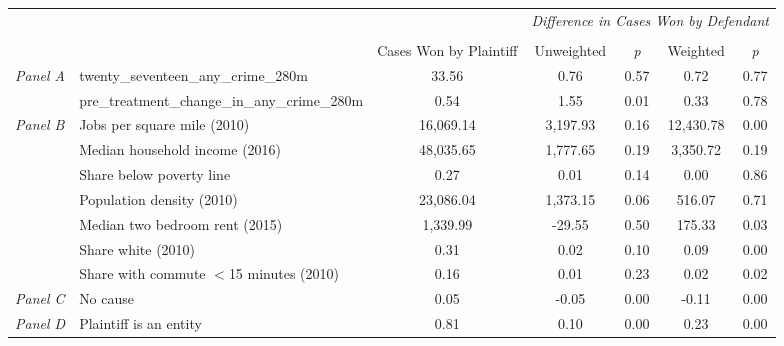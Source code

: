 \begin{tabular}{llccccc}
\toprule
 &  & \textit{} & \multicolumn{4}{c}{\textit{Difference in Cases Won by Defendant}} \\
\cline{4-7}
\\
 &  & Cases Won by Plaintiff & Unweighted & \emph{p} & Weighted & \emph{p} \\
\midrule
\multirow[c]{2}{3cm}{\textit{Panel A}} & twenty_seventeen_any_crime_280m & 33.56 & 0.76 & 0.57 & 0.72 & 0.77 \\
 & pre_treatment_change_in_any_crime_280m & 0.54 & 1.55 & 0.01 & 0.33 & 0.78 \\
\cline{1-7}
\multirow[c]{7}{3cm}{\textit{Panel B}} & Jobs per square mile (2010) & 16,069.14 & 3,197.93 & 0.16 & 12,430.78 & 0.00 \\
 & Median household income (2016) & 48,035.65 & 1,777.65 & 0.19 & 3,350.72 & 0.19 \\
 & Share below poverty line & 0.27 & 0.01 & 0.14 & 0.00 & 0.86 \\
 & Population density (2010) & 23,086.04 & 1,373.15 & 0.06 & 516.07 & 0.71 \\
 & Median two bedroom rent (2015) & 1,339.99 & -29.55 & 0.50 & 175.33 & 0.03 \\
 & Share white (2010) & 0.31 & 0.02 & 0.10 & 0.09 & 0.00 \\
 & Share with commute $<$15 minutes (2010) & 0.16 & 0.01 & 0.23 & 0.02 & 0.02 \\
\cline{1-7}
\textit{Panel C} & No cause & 0.05 & -0.05 & 0.00 & -0.11 & 0.00 \\
\cline{1-7}
\textit{Panel D} & Plaintiff is an entity & 0.81 & 0.10 & 0.00 & 0.23 & 0.00 \\
\cline{1-7}
\bottomrule
\end{tabular}
